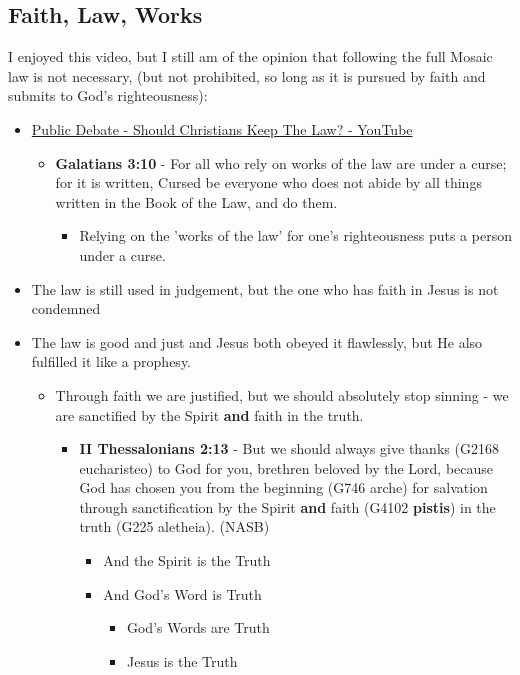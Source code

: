 \documentclass[11pt]{article}
\begin{document}
\subsection{Faith, Law, Works}
\label{sec:org519167f}
I enjoyed this video, but I still am of the opinion that following the full Mosaic law is not necessary, (but not prohibited, so long as it is pursued by faith and submits to God's righteousness):
\begin{itemize}
\item \href{https://www.youtube.com/watch?v=CNHKqhwu6Bo}{Public Debate - Should Christians Keep The Law? - YouTube}
\begin{itemize}
\item \textbf{Galatians 3:10} - For all who rely on works of the law are under a curse; for it is written, Cursed be everyone who does not abide by all things written in the Book of the Law, and do them.
\begin{itemize}
\item Relying on the 'works of the law' for one's righteousness puts a person under a curse.
\end{itemize}
\end{itemize}
\item The law is still used in judgement, but the one who has faith in Jesus is not condemned
\item The law is good and just and Jesus both obeyed it flawlessly, but He also fulfilled it like a prophesy.
\begin{itemize}
\item Through faith we are justified, but we should absolutely stop sinning - we are sanctified by the Spirit \textbf{and} faith in the truth.
\begin{itemize}
\item \textbf{II Thessalonians 2:13} - But we should always give thanks (G2168 eucharisteo) to God for you, brethren beloved by the Lord, because God has chosen you from the beginning (G746 arche) for salvation through sanctification by the Spirit \textbf{and} faith (G4102 \textbf{pistis}) in the truth (G225 aletheia). (NASB)
\begin{itemize}
\item And the Spirit is the Truth
\item And God's Word is Truth
\begin{itemize}
\item God's Words are Truth
\item Jesus is the Truth
\end{itemize}

\end{itemize}
\end{itemize}
\end{itemize}
\end{itemize}
\end{document}
